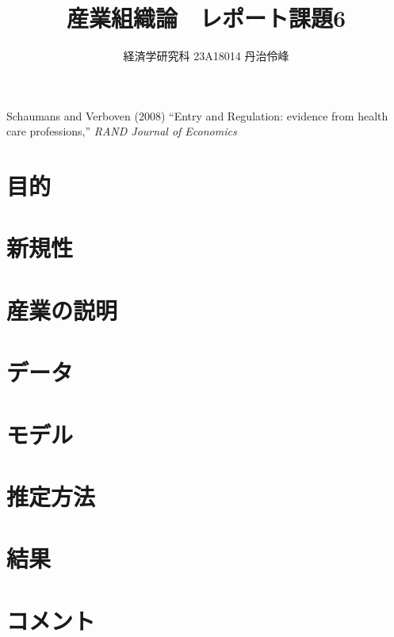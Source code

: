 \documentclass[11.5pt]{jsarticle}
\begin{document}
\title{産業組織論　レポート課題6}
\author{経済学研究科 23A18014 丹治伶峰}
\date{}
\maketitle

\large
Schaumans and Verboven (2008) ``Entry and Regulation: evidence from health care professions,'' \textit{RAND Journal of Economics}

\normalsize

\section{目的}

\section{新規性}

\section{産業の説明}

\section{データ}

\section{モデル}

\section{推定方法}

\section{結果}

\section{コメント}
\end{document}

